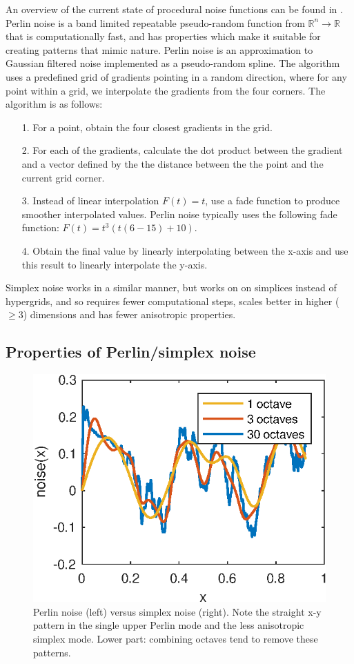 \documentclass[aps,pre,twocolumn,letterpaper,floatfix,showpacs]{revtex4}
\begin{document}
An overview of the current state of procedural noise functions can be
found in \cite{lagae2010state}. Perlin noise is a band limited repeatable pseudo-random function
from $\mathbb R^n \to \mathbb R$ that is computationally fast, and has
properties which make it suitable for creating patterns that mimic
nature. Perlin noise is an approximation to Gaussian filtered noise
implemented as a pseudo-random spline. The algorithm uses a predefined
grid of gradients pointing in a random direction, where for any point
within a grid, we interpolate the gradients from the four corners. The
algorithm is as follows:
\begin{itemize}
  \item[1.] For a point, obtain the four closest gradients in the grid.
   \item [2.] For each of the gradients, calculate the dot product
     between the gradient and a vector defined by the  the distance
     between the the point and the current grid corner. 
   \item [3.] Instead of linear interpolation $F(t) = t$, use a fade function to produce
   smoother interpolated values. Perlin noise typically uses the following fade function: $F(t) = t ^3 (t  (6 - 15) + 10)$.
    \item [4.] Obtain the final value by linearly interpolating between the x-axis and
      use this result to linearly interpolate the y-axis. 
\end{itemize} 
Simplex noise works in a similar manner, but works on on simplices instead of hypergrids,
and so requires fewer computational steps, scales better in higher ($\ge 3$) dimensions
and has fewer anisotropic properties. 

\subsection{Properties of Perlin/simplex noise}
\begin{figure}
\includegraphics[width=.5\textwidth]{noise.eps}
\caption{Perlin noise (left) versus simplex noise (right). Note the
  straight x-y pattern in the single upper Perlin mode and the less
  anisotropic simplex mode. Lower part: combining octaves tend
  to remove these patterns.}
\label{fig:noise}
\end{figure}
\end{document}
